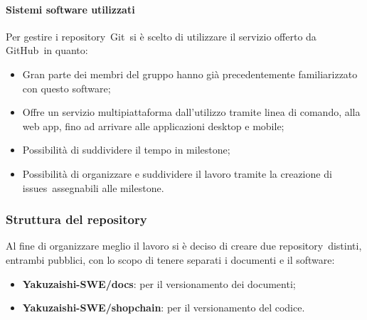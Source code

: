         \paragraph{Sistemi software utilizzati}
        Per gestire i repository\glo\ Git\glo\ si è scelto di utilizzare il servizio offerto da GitHub\glo\ in quanto:
        \begin{itemize}
            \item Gran parte dei membri del gruppo hanno già precedentemente familiarizzato con questo software;
            \item Offre un servizio multipiattaforma dall'utilizzo tramite linea di comando, alla web app, fino ad arrivare alle applicazioni desktop e mobile;
            \item Possibilità di suddividere il tempo in milestone\glo;
            \item Possibilità di organizzare e suddividere il lavoro tramite la creazione di issues\glo\ assegnabili alle milestone\glo.
        \end{itemize} 

    \subsubsection{Struttura del repository}
    Al fine di organizzare meglio il lavoro si è deciso di creare due repository\glo\ distinti, entrambi pubblici, con lo scopo di tenere separati i documenti e il software:
    \begin{itemize}
        \item \textbf{Yakuzaishi-SWE/docs}: per il versionamento dei documenti;
        \item \textbf{Yakuzaishi-SWE/shopchain}: per il versionamento del codice.
    \end{itemize}

